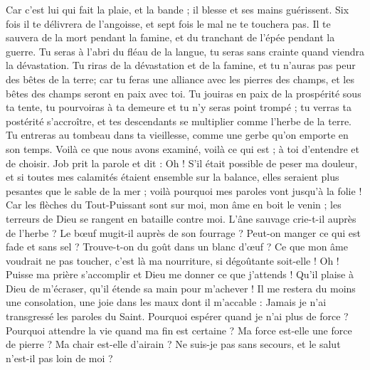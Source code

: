 \begin{multicols}{2}
Car c'est lui qui fait la plaie, et la bande ; il blesse et ses mains guérissent.
Six fois il te délivrera de l'angoisse, et sept fois le mal ne te touchera pas.
Il te sauvera de la mort pendant la famine, et du tranchant de l'épée pendant la guerre.
Tu seras à l'abri du fléau de la langue, tu seras sans crainte quand viendra la dévastation.
Tu riras de la dévastation et de la famine, et tu n'auras pas peur des bêtes de la terre;
car tu feras une alliance avec les pierres des champs, et les bêtes des champs seront en paix avec toi.
Tu jouiras en paix de la prospérité sous ta tente, tu pourvoiras à ta demeure et tu n'y seras point trompé ;
tu verras ta postérité s'accroître, et tes descendants se multiplier comme l'herbe de la terre.
Tu entreras au tombeau dans ta vieillesse, comme une gerbe qu'on emporte en son temps.
Voilà ce que nous avons examiné, voilà ce qui est ; à toi d'entendre et de choisir.
\VerseOne{}Job prit la parole et dit :
Oh ! S'il était possible de peser ma douleur, et si toutes mes calamités étaient ensemble sur la balance,
elles seraient plus pesantes que le sable de la mer ; voilà pourquoi mes paroles vont jusqu'à la folie !
Car les flèches du Tout-Puissant sont sur moi, mon âme en boit le venin ; les terreurs de Dieu se rangent en bataille contre moi.
L'âne sauvage crie-t-il auprès de l'herbe ? Le bœuf mugit-il auprès de son fourrage ?
Peut-on manger ce qui est fade et sans sel ? Trouve-t-on du goût dans un blanc d'œuf ?
Ce que mon âme voudrait ne pas toucher, c'est là ma nourriture, si dégoûtante soit-elle !
Oh ! Puisse ma prière s'accomplir et Dieu me donner ce que j'attends !
Qu'il plaise à Dieu de m'écraser, qu'il étende sa main pour m'achever !
Il me restera du moins une consolation, une joie dans les maux dont il m'accable : Jamais je n'ai transgressé les paroles du Saint.
Pourquoi espérer quand je n'ai plus de force ? Pourquoi attendre la vie quand ma fin est certaine ?
Ma force est-elle une force de pierre ? Ma chair est-elle d'airain ?
Ne suis-je pas sans secours, et le salut n'est-il pas loin de moi ?

\end{multicols}

